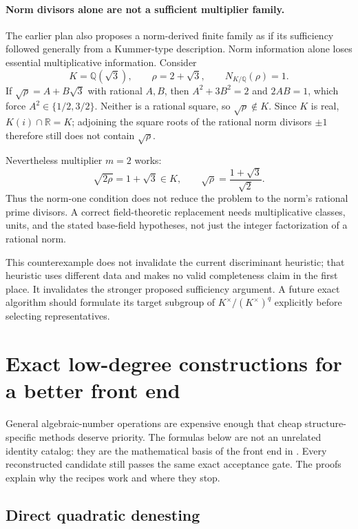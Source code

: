 \documentclass[11pt,letterpaper]{article}
\newcommand{\code}[1]{\texttt{\detokenize{#1}}}
\newcommand{\Q}{\mathbb{Q}}
\newcommand{\R}{\mathbb{R}}
\theoremstyle{definition}
\theoremstyle{remark}
\begin{document}
\paragraph{Norm divisors alone are not a sufficient multiplier family.}
The earlier plan also proposes a norm-derived finite family as if its sufficiency followed generally from a Kummer-type description. Norm information alone loses essential multiplicative information. Consider
\[
 K=\Q(\sqrt3),\qquad \rho=2+\sqrt3,\qquad N_{K/\Q}(\rho)=1.
\]
If $\sqrt\rho=A+B\sqrt3$ with rational $A,B$, then $A^2+3B^2=2$ and $2AB=1$, which force $A^2\in\{1/2,3/2\}$. Neither is a rational square, so $\sqrt\rho\notin K$. Since $K$ is real, $K(i)\cap\R=K$; adjoining the square roots of the rational norm divisors $\pm1$ therefore still does not contain $\sqrt\rho$.

Nevertheless multiplier $m=2$ works:
\[
 \sqrt{2\rho}=1+\sqrt3\in K,\qquad
 \sqrt\rho=\frac{1+\sqrt3}{\sqrt2}.
\]
Thus the norm-one condition does not reduce the problem to the norm's rational prime divisors. A correct field-theoretic replacement needs multiplicative classes, units, and the stated base-field hypotheses, not just the integer factorization of a rational norm.\cite{priorfuture}

This counterexample does not invalidate the current discriminant heuristic; that heuristic uses different data and makes no valid completeness claim in the first place. It invalidates the stronger proposed sufficiency argument. A future exact algorithm should formulate its target subgroup of $K^{\times}/(K^{\times})^q$ explicitly before selecting representatives.

\section{Exact low-degree constructions for a better front end}\label{sec:formulas}

General algebraic-number operations are expensive enough that cheap structure-specific methods deserve priority. The formulas below are not an unrelated identity catalog: they are the mathematical basis of the front end in \code{StradImproved.wl}. Every reconstructed candidate still passes the same exact acceptance gate. The proofs explain why the recipes work and where they stop.

\subsection{Direct quadratic denesting}
\end{document}
